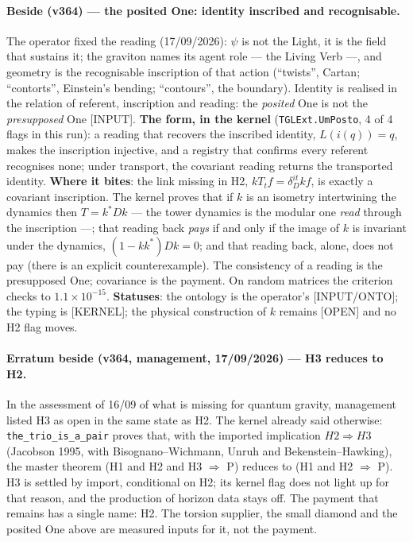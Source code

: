 \documentclass[11pt]{article}
\theoremstyle{definition}\newtheorem{deriv}{Derivation}
\begin{document}
\paragraph*{Beside (v364) --- the posited One: identity inscribed and recognisable.} The operator fixed the reading (17/09/2026): $\psi$ is not the Light, it is the field that sustains it; the graviton names its agent role --- the Living Verb ---, and geometry is the recognisable inscription of that action (``twists'', Cartan; ``contorts'', Einstein's bending; ``contours'', the boundary). Identity is realised in the relation of referent, inscription and reading: the \emph{posited} One is not the \emph{presupposed} One [INPUT]. \textbf{The form, in the kernel} (\texttt{TGLExt.UmPosto}, 4 of 4 flags in this run): a reading that recovers the inscribed identity, $L(i(q))=q$, makes the inscription injective, and a registry that confirms every referent recognises none; under transport, the covariant reading returns the transported identity. \textbf{Where it bites}: the link missing in H2, $kT_tf=\delta_D^{it}kf$, is exactly a covariant inscription. The kernel proves that if $k$ is an isometry intertwining the dynamics then $T=k^*Dk$ --- the tower dynamics is the modular one \emph{read} through the inscription ---; that reading back \emph{pays} if and only if the image of $k$ is invariant under the dynamics, $(1-kk^*)Dk=0$; and that reading back, alone, does not pay (there is an explicit counterexample). The consistency of a reading is the presupposed One; covariance is the payment. On random matrices the criterion checks to $1.1\times10^{-15}$. \textbf{Statuses}: the ontology is the operator's [INPUT/ONTO]; the typing is [KERNEL]; the physical construction of $k$ remains [OPEN] and no H2 flag moves.

\paragraph*{Erratum beside (v364, management, 17/09/2026) --- H3 reduces to H2.} In the assessment of 16/09 of what is missing for quantum gravity, management listed H3 as open in the same state as H2. The kernel already said otherwise: \texttt{the\_trio\_is\_a\_pair} proves that, with the imported implication $H2\Rightarrow H3$ (Jacobson 1995, with Bisognano--Wichmann, Unruh and Bekenstein--Hawking), the master theorem (H1 and H2 and H3 $\Rightarrow$ P) reduces to (H1 and H2 $\Rightarrow$ P). H3 is settled by import, conditional on H2; its kernel flag does not light up for that reason, and the production of horizon data stays off. The payment that remains has a single name: H2. The torsion supplier, the small diamond and the posited One above are measured inputs for it, not the payment.
\end{document}
